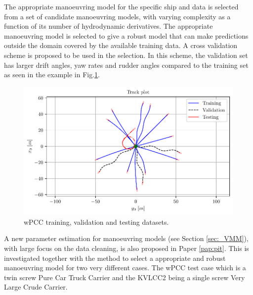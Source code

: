 The appropriate manoeuvring model for the specific ship and data is selected from a set of candidate manoeuvring models, with varying complexity as a function of its number of hydrodynamic derivatives. The appropriate manoeuvring model is selected to give a robust model that can make predictions outside the domain covered by the available training data. A cross validation scheme is proposed to be used in the selection. In this scheme, the validation set has larger drift angles, yaw rates and rudder angles compared to the training set as seen in the example in Fig.\ref{fig:cross_validation}.
\begin{figure}[H]
    \centering
    \includegraphics[width=\linewidth]{kappa/images/3.pdf}
    \caption{wPCC training, validation and testing datasets.}
    \label{fig:cross_validation}
\end{figure}
\noindent A new parameter estimation for manoeuvring models (see Section \ref{sec:_VMM}), with large focus on the data cleaning, is also proposed in Paper \ref{pap:pit}. This  is investigated together with the method to select a appropriate and robust manoeuvring model for two very different cases. The wPCC test case which is a twin screw Pure Car Truck Carrier and the KVLCC2 being a single screw Very Large Crude Carrier.    
